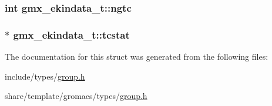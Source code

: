 \hypertarget{structgmx__ekindata__t_a4b812b7a5107e1ffb9f691a490ea11b3}{
\subsubsection[{ngtc}]{\setlength{\rightskip}{0pt plus 5cm}int {\bf gmx\-\_\-ekindata\-\_\-t\-::ngtc}}}\label{structgmx__ekindata__t_a4b812b7a5107e1ffb9f691a490ea11b3}
\hypertarget{structgmx__ekindata__t_ab6ed89be8fc3034982605b7e3edc8b6d}{
\subsubsection[{tcstat}]{ $\ast$ {\bf gmx\-\_\-ekindata\-\_\-t\-::tcstat}}}\label{structgmx__ekindata__t_ab6ed89be8fc3034982605b7e3edc8b6d}


\-The documentation for this struct was generated from the following files\-:\begin{DoxyCompactItemize}
\item 
include/types/\hyperlink{include_2types_2group_8h}{group.\-h}\item 
share/template/gromacs/types/\hyperlink{share_2template_2gromacs_2types_2group_8h}{group.\-h}\end{DoxyCompactItemize}
